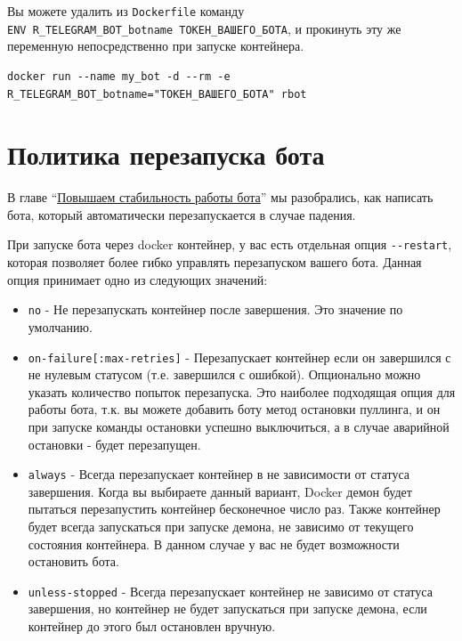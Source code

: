 \documentclass[
]{book}
\providecommand{\tightlist}{%
  \setlength{\itemsep}{0pt}\setlength{\parskip}{0pt}}
\begin{document}
Вы можете удалить из \texttt{Dockerfile} команду \texttt{ENV\ R\_TELEGRAM\_BOT\_botname\ ТОКЕН\_ВАШЕГО\_БОТА}, и прокинуть эту же переменную непосредственно при запуске контейнера.

\begin{verbatim}
docker run --name my_bot -d --rm -e R_TELEGRAM_BOT_botname="ТОКЕН_ВАШЕГО_БОТА" rbot
\end{verbatim}

\section{Политика перезапуска бота}\label{ux43fux43eux43bux438ux442ux438ux43aux430-ux43fux435ux440ux435ux437ux430ux43fux443ux441ux43aux430-ux431ux43eux442ux430}

В главе ``\hyperref[ux43fux43eux432ux44bux448ux430ux435ux43c-ux441ux442ux430ux431ux438ux43bux44cux43dux43eux441ux442ux44c-ux440ux430ux431ux43eux442ux44b-ux431ux43eux442ux430]{Повышаем стабильность работы бота}'' мы разобрались, как написать бота, который автоматически перезапускается в случае падения.

При запуске бота через docker контейнер, у вас есть отдельная опция \texttt{-\/-restart}, которая позволяет более гибко управлять перезапуском вашего бота. Данная опция принимает одно из следующих значений:

\begin{itemize}
\tightlist
\item
  \texttt{no} - Не перезапускать контейнер после завершения. Это значение по умолчанию.
\item
  \texttt{on-failure{[}:max-retries{]}} - Перезапускает контейнер если он завершился с не нулевым статусом (т.е. завершился с ошибкой). Опционально можно указать количество попыток перезапуска. Это наиболее подходящая опция для работы бота, т.к. вы можете добавить боту метод остановки пуллинга, и он при запуске команды остановки успешно выключиться, а в случае аварийной остановки - будет перезапущен.
\item
  \texttt{always} - Всегда перезапускает контейнер в не зависимости от статуса завершения. Когда вы выбираете данный вариант, Docker демон будет пытаться перезапустить контейнер бесконечное число раз. Также контейнер будет всегда запускаться при запуске демона, не зависимо от текущего состояния контейнера. В данном случае у вас не будет возможности остановить бота.
\item
  \texttt{unless-stopped} - Всегда перезапускает контейнер не зависимо от статуса завершения, но контейнер не будет запускаться при запуске демона, если контейнер до этого был остановлен вручную.
\end{itemize}
\end{document}
